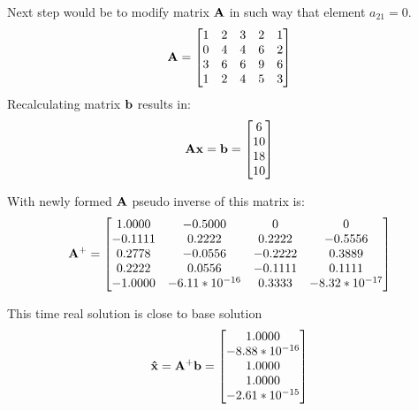 Next step would be to modify matrix $\mathbf{A}$ in such way that element $a_{21} = 0$.  
\begin{equation*}
    \mathbf{A} = 
    \begin{bmatrix}
        1 & 2 & 3 & 2 & 1 \\
        0 & 4 & 4 & 6 & 2 \\
        3 & 6 & 6 & 9 & 6 \\
        1 & 2 & 4 & 5 & 3
    \end{bmatrix}
\end{equation*}
Recalculating matrix $\mathbf{b}$ results in:
\begin{equation*}
    \mathbf{A}\mathbf{x} = \mathbf{b} = 
    \begin{bmatrix}
        6 \\
        10\\
        18\\
        10
    \end{bmatrix}
\end{equation*}

With newly formed $\mathbf{A}$ pseudo inverse of this matrix is:
\begin{equation*}
    \mathbf{A^+} = 
    \begin{bmatrix}
        1.0000  & -0.5000 & 0 & 0 \\
        -0.1111 &   0.2222 & 0.2222 & -0.5556 \\
        0.2778  & -0.0556 & -0.2222 & 0.3889 \\
        0.2222  &  0.0556 & -0.1111 & 0.1111 \\
        -1.0000 &  -6.11 * 10^{-16} & 0.3333 & -8.32 * 10^{-17}
    \end{bmatrix}
\end{equation*}

This time real solution is close to base solution
\begin{equation*}
    \mathbf{\hat{x}} = \mathbf{A^+} \mathbf{b} =
    \begin{bmatrix}
        1.0000 \\
        -8.88 * 10^{-16} \\
        1.0000 \\
        1.0000 \\
        -2.61 * 10^{-15}
    \end{bmatrix}
\end{equation*}

